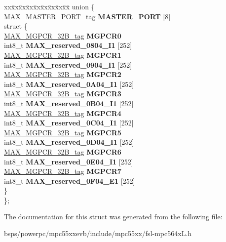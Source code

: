 \begin{DoxyCompactItemize}
\begin{tabbing}
\end{tabbing}\item 
\mbox{\label{structMAX__struct__tag_acee74927ff5e10d510944bde3b832920}} 
\begin{tabbing}
xx\=xx\=xx\=xx\=xx\=xx\=xx\=xx\=xx\=\kill
union \{\\
\>\mbox{\hyperlink{structMAX__MASTER__PORT__struct__tag}{MAX\_MASTER\_PORT\_tag}} {\bfseries MASTER\_PORT} \mbox{[}8\mbox{]}\\
\mbox{\label{unionMAX__struct__tag_1_1_0D2143_a7312e6eac137d9bd314df5c180139854}} 
\>struct \{\\
\>\>\mbox{\hyperlink{unionMAX__MGPCR__32B__tag}{MAX\_MGPCR\_32B\_tag}} {\bfseries MGPCR0}\\
\>\>int8\_t {\bfseries MAX\_reserved\_0804\_I1} \mbox{[}252\mbox{]}\\
\>\>\mbox{\hyperlink{unionMAX__MGPCR__32B__tag}{MAX\_MGPCR\_32B\_tag}} {\bfseries MGPCR1}\\
\>\>int8\_t {\bfseries MAX\_reserved\_0904\_I1} \mbox{[}252\mbox{]}\\
\>\>\mbox{\hyperlink{unionMAX__MGPCR__32B__tag}{MAX\_MGPCR\_32B\_tag}} {\bfseries MGPCR2}\\
\>\>int8\_t {\bfseries MAX\_reserved\_0A04\_I1} \mbox{[}252\mbox{]}\\
\>\>\mbox{\hyperlink{unionMAX__MGPCR__32B__tag}{MAX\_MGPCR\_32B\_tag}} {\bfseries MGPCR3}\\
\>\>int8\_t {\bfseries MAX\_reserved\_0B04\_I1} \mbox{[}252\mbox{]}\\
\>\>\mbox{\hyperlink{unionMAX__MGPCR__32B__tag}{MAX\_MGPCR\_32B\_tag}} {\bfseries MGPCR4}\\
\>\>int8\_t {\bfseries MAX\_reserved\_0C04\_I1} \mbox{[}252\mbox{]}\\
\>\>\mbox{\hyperlink{unionMAX__MGPCR__32B__tag}{MAX\_MGPCR\_32B\_tag}} {\bfseries MGPCR5}\\
\>\>int8\_t {\bfseries MAX\_reserved\_0D04\_I1} \mbox{[}252\mbox{]}\\
\>\>\mbox{\hyperlink{unionMAX__MGPCR__32B__tag}{MAX\_MGPCR\_32B\_tag}} {\bfseries MGPCR6}\\
\>\>int8\_t {\bfseries MAX\_reserved\_0E04\_I1} \mbox{[}252\mbox{]}\\
\>\>\mbox{\hyperlink{unionMAX__MGPCR__32B__tag}{MAX\_MGPCR\_32B\_tag}} {\bfseries MGPCR7}\\
\>\>int8\_t {\bfseries MAX\_reserved\_0F04\_E1} \mbox{[}252\mbox{]}\\
\>\} \\
\}; \\

\end{tabbing}\end{DoxyCompactItemize}


The documentation for this struct was generated from the following file\+:\begin{DoxyCompactItemize}
\item 
bsps/powerpc/mpc55xxevb/include/mpc55xx/fsl-\/mpc564x\+L.\+h\end{DoxyCompactItemize}
